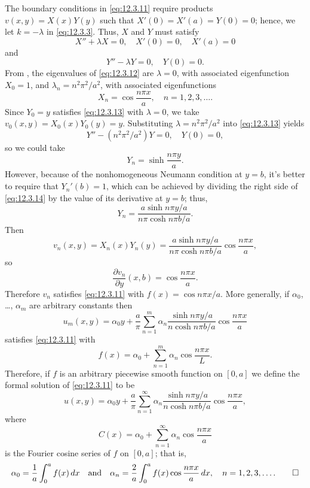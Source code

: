 \begin{solution}
The boundary conditions in \eqref{eq:12.3.11} require
 products $v(x,y)=X(x)Y(y)$ such that
$X'(0)=X'(a)=Y(0)=0$; hence, we let $k=-\lambda$ in
\eqref{eq:12.3.3}. Thus, $X$ and $Y$ must satisfy
\begin{equation} \label{eq:12.3.12}
X''+\lambda X=0,\quad X'(0)=0,\quad X'(a)=0
\end{equation}
and
\begin{equation} \label{eq:12.3.13}
Y''-\lambda Y=0,\quad Y(0)=0.
\end{equation}
 From , the eigenvalues of \eqref{eq:12.3.12}
are $\lambda=0$, with associated
eigenfunction $X_0=1$, and $\lambda_n=n^2\pi^2/a^2$, with
associated eigenfunctions
\[
X_n=\cos\frac{n\pi x}{a}, \quad n=1,2,3,\dots.
\]
Since $Y_0=y$ satisfies \eqref{eq:12.3.13} with $\lambda=0$,
we take $v_0(x,y)=X_0(x)Y_0(y)= y$.
Substituting $\lambda=n^2\pi^2/a^2$  into
\eqref{eq:12.3.13} yields
\[
Y''-(n^2\pi^2/a^2)Y=0,\quad Y(0)=0,
\]
so we could take
\begin{equation} \label{eq:12.3.14}
Y_n=\sinh\frac{n\pi y}{a}.
\end{equation}
However, because of the nonhomogeneous Neumann condition at $y=b$, it's
better to require that
$Y_n'(b)=1$, which can be achieved by  dividing the right side
of
\eqref{eq:12.3.14} by the value of its derivative  at $y=b$; thus,
\[
Y_n=\frac{a\sinh n\pi y/a}{n\pi\cosh n\pi b/a}.
\]
Then
\[
v_n(x,y)=X_n(x)Y_n(y)=
\frac{a\sinh n\pi y/a}{n\pi\cosh n\pi b/a}\cos\frac{n\pi x}{a},
\]
so
\[
\frac{\partial v_n}{\partial y}(x,b)=\cos\frac{n\pi x}{a}.
\]
Therefore
 $v_n$ satisfies \eqref{eq:12.3.11} with $f(x)=\cos n\pi x/a$. More
generally,
 if $\alpha_0$, \dots, $\alpha_m$ are arbitrary constants
then
\[
u_m(x,y)=\alpha_0y+\frac{a}{\pi}\sum_{n=1}^m\alpha_n
\frac{\sinh n\pi y/a}{n\cosh n\pi b/a}
\cos\frac{n\pi x}{a}
\]
satisfies \eqref{eq:12.3.11} with
\[
f(x)=\alpha_0+\sum_{n=1}^m\alpha_n\cos\frac{n\pi x}{L}.
\]
Therefore, if $f$ is an arbitrary piecewise smooth function on
$[0,a]$  we define the formal solution of \eqref{eq:12.3.11} to be
\[
u(x,y)=\alpha_0y+\frac{a}{\pi}\sum_{n=1}^\infty \alpha_n
\frac{\sinh n\pi y/a}{n\cosh n\pi b/a}
\cos\frac{n\pi x}{a},
\]
where
\[
C(x)=\alpha_0+\sum_{n=1}^\infty \alpha_n\cos\frac{n\pi x}{a}
\]
is the Fourier cosine series of $f$ on $[0,a]$; that is,
\[
\alpha_0=\frac{1}{a}\int_0^af(x)\,dx
\quad\text{and}\quad
\alpha_n=\frac{2}{a}\int_0^af(x)\cos\frac{n\pi x}{a}\,dx,\quad
n=1,2,3,\dots.\qedhere
\]
\end{solution}

